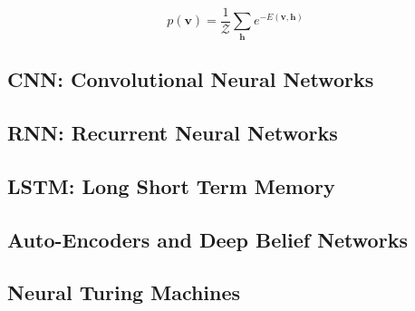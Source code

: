 \begin{equation}
p(\textbf{v}) = \frac{1}{\mathcal{Z}} \sum_{\textbf{h}} e^{-E(\textbf{v},\textbf{h})}
\end{equation}

\subsection{CNN: Convolutional Neural Networks}

\subsection{RNN: Recurrent Neural Networks}

\subsection{LSTM: Long Short Term Memory}

\subsection{Auto-Encoders and Deep Belief Networks}

\subsection{Neural Turing Machines}
